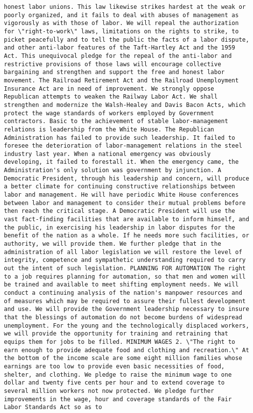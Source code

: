 \documentclass[
]{article}
\begin{document}
\begin{verbatim}
honest labor unions. This law likewise strikes hardest at the weak or poorly organized, and it fails to deal with abuses of management as vigorously as with those of labor. We will repeal the authorization for \"right-to-work\" laws, limitations on the rights to strike, to picket peacefully and to tell the public the facts of a labor dispute, and other anti-labor features of the Taft-Hartley Act and the 1959 Act. This unequivocal pledge for the repeal of the anti-labor and restrictive provisions of those laws will encourage collective bargaining and strengthen and support the free and honest labor movement. The Railroad Retirement Act and the Railroad Unemployment Insurance Act are in need of improvement. We strongly oppose Republican attempts to weaken the Railway Labor Act. We shall strengthen and modernize the Walsh-Healey and Davis Bacon Acts, which protect the wage standards of workers employed by Government contractors. Basic to the achievement of stable labor-management relations is leadership from the White House. The Republican Administration has failed to provide such leadership. It failed to foresee the deterioration of labor-management relations in the steel industry last year. When a national emergency was obviously developing, it failed to forestall it. When the emergency came, the Administration's only solution was government by injunction. A Democratic President, through his leadership and concern, will produce a better climate for continuing constructive relationships between labor and management. He will have periodic White House conferences between labor and management to consider their mutual problems before then reach the critical stage. A Democratic President will use the vast fact-finding facilities that are available to inform himself, and the public, in exercising his leadership in labor disputes for the benefit of the nation as a whole. If he needs more such facilities, or authority, we will provide them. We further pledge that in the administration of all labor legislation we will restore the level of integrity, competence and sympathetic understanding required to carry out the intent of such legislation. PLANNING FOR AUTOMATION The right to a job requires planning for automation, so that men and women will be trained and available to meet shifting employment needs. We will conduct a continuing analysis of the nation's manpower resources and of measures which may be required to assure their fullest development and use. We will provide the Government leadership necessary to insure that the blessings of automation do not become burdens of widespread unemployment. For the young and the technologically displaced workers, we will provide the opportunity for training and retraining that equips them for jobs to be filled. MINIMUM WAGES 2. \"The right to earn enough to provide adequate food and clothing and recreation.\" At the bottom of the income scale are some eight million families whose earnings are too low to provide even basic necessities of food, shelter, and clothing. We pledge to raise the minimum wage to one dollar and twenty five cents per hour and to extend coverage to several million workers not now protected. We pledge further improvements in the wage, hour and coverage standards of the Fair Labor Standards Act so as to 
\end{verbatim}
\end{document}
